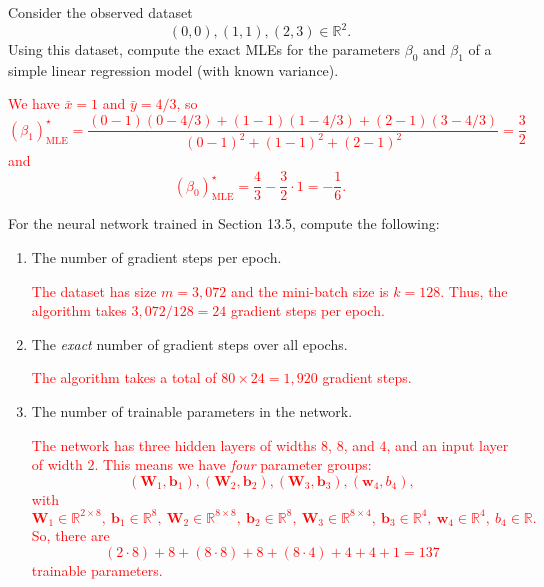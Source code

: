 \documentclass[12pt,reqno]{amsart}
\begin{document}
\bigskip
\prob Consider the observed dataset
	\[
	(0, 0), (1, 1), (2,3) \in \mathbb{R}^2.
	\]
Using this dataset, compute the exact MLEs for the parameters $\beta_0$ and $\beta_1$ of a simple linear regression model (with known variance).

\bigskip
\textcolor{red}{We have $\bar{x} = 1$ and $\bar{y} = 4/3$, so
	\[
	(\beta_1)^\star_\text{MLE} = \frac{(0-1)(0-4/3) + (1-1)(1-4/3) + (2-1)(3-4/3)}{(0-1)^2 + (1-1)^2 + (2-1)^2} = \frac{3}{2}
	\]
and
	\[
	(\beta_0)^\star_\text{MLE} = \frac{4}{3} - \frac{3}{2} \cdot 1 = - \frac{1}{6}.
	\]}
\bigskip







\prob For the neural network trained in Section 13.5, compute the following:

\bigskip
\begin{enumerate}
\item The number of gradient steps per epoch.

\bigskip
\textcolor{red}{The dataset has size $m=3{,}072$ and the mini-batch size is $k=128$. Thus, the algorithm takes $3{,}072/128 = 24$ gradient steps per epoch.}
\bigskip

\item The \textit{exact} number of gradient steps over all epochs.

\bigskip
\textcolor{red}{The algorithm takes a total of $80 \times 24 = 1{,}920$ gradient steps.}
\bigskip

\item The number of trainable parameters in the network.

\bigskip
\textcolor{red}{The network has three hidden layers of widths $8$, $8$, and $4$, and an input layer of width $2$. This means we have \textit{four} parameter groups:
	\[
	(\mathbf{W}_1,\mathbf{b}_1),(\mathbf{W}_2,\mathbf{b}_2),(\mathbf{W}_3,\mathbf{b}_3),(\mathbf{w}_4,b_4),
	\]
with
	\[
	\mathbf{W}_1 \in \mathbb{R}^{2\times 8}, \ \mathbf{b}_1 \in \mathbb{R}^8, \ \mathbf{W}_2 \in \mathbb{R}^{8\times 8}, \ \mathbf{b}_2 \in \mathbb{R}^8, \ \mathbf{W}_3 \in \mathbb{R}^{8\times 4}, \ \mathbf{b}_3 \in \mathbb{R}^4, \ \mathbf{w}_4 \in \mathbb{R}^{4}, \ b_4 \in \mathbb{R} .
	\]
So, there are
	\[
	(2\cdot 8) + 8 + (8 \cdot 8) + 8 + (8 \cdot 4) + 4 + 4 + 1 = 137
	\]
trainable parameters.}
\end{enumerate}
\end{document}

